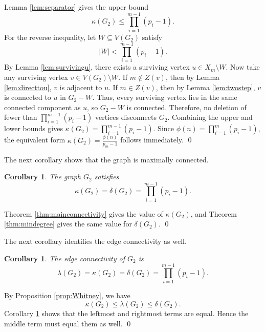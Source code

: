 \documentclass[12pt]{article}
\renewenvironment{proof}{{\bf \noindent Proof.}}{\qed}
\newtheorem{corollary}[theorem]{Corollary}
\theoremstyle{definition}
\begin{document}
	\begin{proof}
		Lemma \ref{lem:separator} gives the upper bound
		$$
		\kappa(G_2)\leq \prod_{i=1}^{m-1}(p_i-1).
		$$
		For the reverse inequality, let $W\subseteq V(G_2)$ satisfy
		$$
		|W|<\prod_{i=1}^{m-1}(p_i-1).
		$$
		By Lemma \ref{lem:survivingu}, there exists a surviving vertex $u\in X_{{m}}\setminus W$. Now take any surviving vertex $v\in V(G_2)\setminus W$. If $m\notin Z(v)$, then by Lemma \ref{lem:directtou}, $v$ is adjacent to $u$. If $m\in Z(v)$, then by Lemma \ref{lem:twostep}, $v$ is connected to $u$ in $G_2-W$. Thus, every surviving vertex lies in the same connected component as $u$, so $G_2-W$ is connected. Therefore, no deletion of fewer than $\prod_{i=1}^{m-1}(p_i-1)$ vertices disconnects $G_2$. Combining the upper and lower bounds gives
		$ \kappa(G_2)=\prod_{i=1}^{m-1}(p_i-1). $
		Since $\phi(n)=\prod_{i=1}^m(p_i-1)$, the equivalent form $ \kappa(G_2)=\frac{\phi(n)}{p_m-1} $ follows immediately.
	\end{proof}
	
	\medskip
	The next corollary shows that the graph is maximally connected.	
	\begin{corollary}\label{cor:maxconn}
		The graph $G_2$ satisfies
		$$
		\kappa(G_2)=\delta(G_2)=\prod_{i=1}^{m-1}(p_i-1).
		$$
	\end{corollary}
	
	\begin{proof}
		Theorem \ref{thm:mainconnectivity} gives the value of $\kappa(G_2)$, and Theorem \ref{thm:mindegree} gives the same value for $\delta(G_2)$.
	\end{proof}
	
	\medskip
	 The next corollary identifies the edge connectivity as well.	
	\begin{corollary}\label{cor:edgeconn}
		The edge connectivity of $G_2$ is
		$$
		\lambda(G_2)=\kappa(G_2)=\delta(G_2)=\prod_{i=1}^{m-1}(p_i-1).
		$$
	\end{corollary}
	
	\begin{proof}
		By Proposition \ref{prop:Whitney}, we have
		$$
		\kappa(G_2)\leq \lambda(G_2)\leq \delta(G_2).
		$$
		Corollary \ref{cor:maxconn} shows that the leftmost and rightmost terms are equal. Hence the middle term must equal them as well.
	\end{proof}
	
\end{document}
